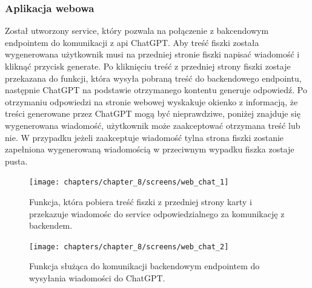 \subsubsection{Aplikacja webowa}
Został utworzony service, który pozwala na połączenie z bakcendowym endpointem do komunikacji z api ChatGPT. Aby treść fiszki została wygenerowana użytkownik musi na przedniej stronie fiszki napisać wiadomość i kliknąć przycisk generate. Po kliknięciu treść z przedniej strony fiszki zostaje przekazana do funkcji, która wysyła pobraną treść do backendowego endpointu, następnie ChatGPT na podstawie otrzymanego kontentu generuje odpowiedź. Po otrzymaniu odpowiedzi na stronie webowej wyskakuje okienko z informacją, że treści generowane przez ChatGPT mogą być nieprawdziwe, poniżej znajduje się wygenerowana wiadomość, użytkownik może zaakceptować otrzymana treść lub nie. W przypadku jeżeli zaakceptuje wiadomość tylna strona fiszki zostanie zapełniona wygenerowaną wiadomością w przeciwnym wypadku fiszka zostaje pusta.

\begin{figure}[H]
    \centering
    \texttt{[image: chapters/chapter\_8/screens/web\_chat\_1]}
    \caption{Funkcja, która pobiera treść fiszki z przedniej strony karty i przekazuje wiadomośc do service odpowiedzialnego za komunikację z backendem.}
    \label{img:web_chat_1}
\end{figure}

\begin{figure}[H]
    \centering
    \texttt{[image: chapters/chapter\_8/screens/web\_chat\_2]}
    \caption{Funkcja służąca do komunikacji backendowym endpointem do wysyłania wiadomości do ChatGPT.}
    \label{img:web_chat_2}
\end{figure}